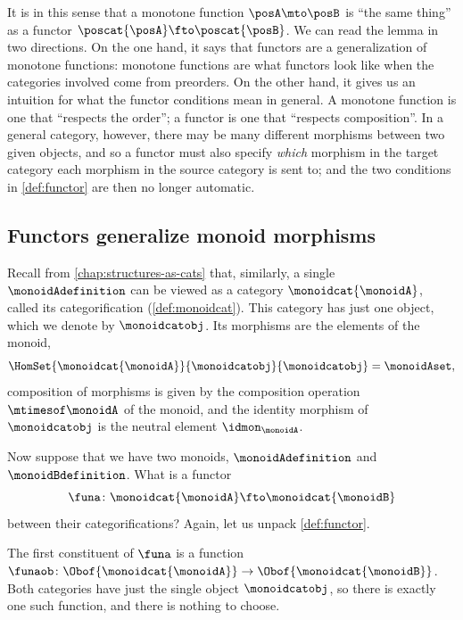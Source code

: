 It is in this sense that a monotone function $\posA \mto \posB$ is ``the same thing'' as a functor $\poscat{\posA} \fto \poscat{\posB}$.
We can read the lemma in two directions.
On the one hand, it says that functors are a generalization of monotone functions: monotone functions are what functors look like when the categories involved come from preorders.
On the other hand, it gives us an intuition for what the functor conditions mean in general.
A monotone function is one that ``respects the order''; a functor is one that ``respects composition''.
In a general category, however, there may be many different morphisms between two given objects, and so a functor must also specify \emph{which} morphism in the target category each morphism in the source category is sent to; and the two conditions in \cref{def:functor} are then no longer automatic.

\subsection{Functors generalize monoid morphisms}
\label{sec:functors-generalize-monoid-morphisms}


Recall from \cref{chap:structures-as-cats} that, similarly, a single  $\monoidAdefinition$ can be viewed as a category $\monoidcat{\monoidA}$, called its categorification (\cref{def:monoidcat}).
This category has just one object, which we denote by $\monoidcatobj$.
Its morphisms are the elements of the monoid,
\begin{equation}
    \HomSet{\monoidcat{\monoidA}}{\monoidcatobj}{\monoidcatobj} = \monoidAset,
\end{equation}
composition of morphisms is given by the composition operation $\mtimesof\monoidA$ of the monoid, and the identity morphism of $\monoidcatobj$ is the neutral element $\idmon_\monoidA$.

Now suppose that we have two monoids, $\monoidAdefinition$ and $\monoidBdefinition$.
What is a functor
\begin{equation}
    \funa \colon \monoidcat{\monoidA} \fto \monoidcat{\monoidB}
\end{equation}
between their categorifications?
Again, let us unpack \cref{def:functor}.

The first constituent of $\funa$ is a function $\funaob \colon \Obof{\monoidcat{\monoidA}} \to \Obof{\monoidcat{\monoidB}}$.
Both categories have just the single object $\monoidcatobj$, so there is exactly one such function, and there is nothing to choose.

